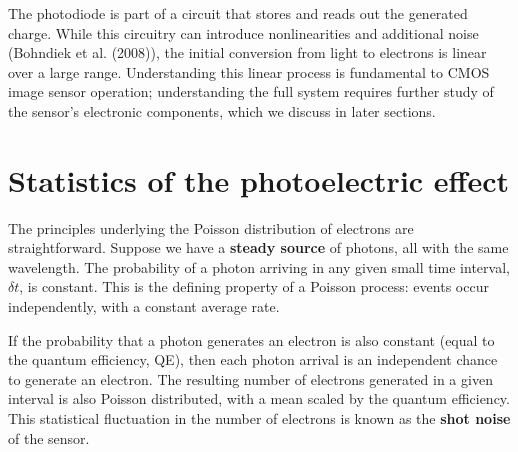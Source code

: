 \documentclass[
  letterpaper,
]{book}
\begin{document}
The photodiode is part of a circuit that stores and reads out the
generated charge. While this circuitry can introduce nonlinearities and
additional noise (Bohndiek et al. (2008)), the initial conversion from
light to electrons is linear over a large range. Understanding this
linear process is fundamental to CMOS image sensor operation;
understanding the full system requires further study of the sensor's
electronic components, which we discuss in later sections.

\section{Statistics of the photoelectric effect}\label{sec-shot-noise}

The principles underlying the Poisson distribution of electrons are
straightforward. Suppose we have a \textbf{steady source} of photons,
all with the same wavelength. The probability of a photon arriving in
any given small time interval, \(\delta t\), is constant. This is the
defining property of a Poisson process: events occur independently, with
a constant average rate.

If the probability that a photon generates an electron is also constant
(equal to the quantum efficiency, QE), then each photon arrival is an
independent chance to generate an electron. The resulting number of
electrons generated in a given interval is also Poisson distributed,
with a mean scaled by the quantum efficiency. This statistical
fluctuation in the number of electrons is known as the \textbf{shot
noise} of the sensor.
\end{document}
